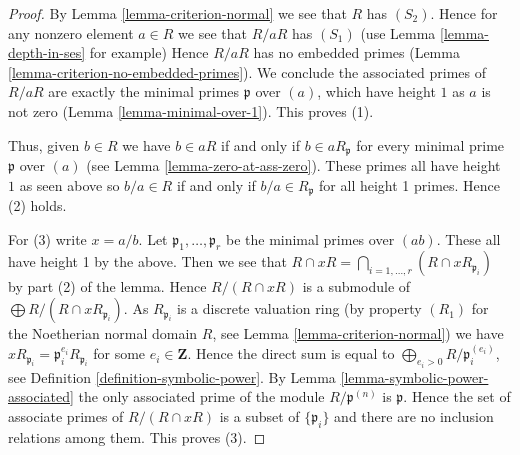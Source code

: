 \begin{proof}
By Lemma \ref{lemma-criterion-normal} we see that $R$ has $(S_2)$.
Hence for any nonzero element $a \in R$ we see that $R/aR$ has $(S_1)$
(use Lemma \ref{lemma-depth-in-ses} for example)
Hence $R/aR$ has no embedded primes
(Lemma \ref{lemma-criterion-no-embedded-primes}).
We conclude the associated primes of $R/aR$ are exactly
the minimal primes $\mathfrak p$ over $(a)$, which have height $1$
as $a$ is not zero (Lemma \ref{lemma-minimal-over-1}). This proves (1).

\medskip\noindent
Thus, given $b \in R$ we have $b \in aR$ if and only if
$b \in aR_{\mathfrak p}$ for every minimal prime $\mathfrak p$
over $(a)$ (see Lemma \ref{lemma-zero-at-ass-zero}).
These primes all have height $1$ as seen above so
$b/a \in R$ if and only if $b/a \in R_{\mathfrak p}$ for all
height 1 primes. Hence (2) holds.

\medskip\noindent
For (3) write $x = a/b$. Let $\mathfrak p_1, \ldots, \mathfrak p_r$
be the minimal primes over $(ab)$. These all have height 1 by the above.
Then we see that
$R \cap xR = \bigcap_{i = 1, \ldots, r} (R \cap xR_{\mathfrak p_i})$
by part (2) of the lemma. Hence $R/(R \cap xR)$ is a submodule of
$\bigoplus R/(R \cap xR_{\mathfrak p_i})$.
As $R_{\mathfrak p_i}$ is a discrete valuation ring (by property $(R_1)$
for the Noetherian normal domain $R$, see Lemma \ref{lemma-criterion-normal})
we have $xR_{\mathfrak p_i} = \mathfrak p_i^{e_i}R_{\mathfrak p_i}$
for some $e_i \in \mathbf{Z}$. Hence the direct sum is equal
to $\bigoplus_{e_i > 0} R/\mathfrak p_i^{(e_i)}$, see
Definition \ref{definition-symbolic-power}.
By Lemma \ref{lemma-symbolic-power-associated}
the only associated prime of the module
$R/\mathfrak p^{(n)}$ is $\mathfrak p$. Hence the set of associate primes
of $R/(R \cap xR)$ is a subset of $\{\mathfrak p_i\}$ and there are
no inclusion relations among them. This proves (3).
\end{proof}















